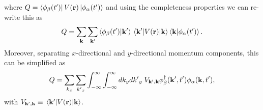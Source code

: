 where $Q = \bra{\phi_{\beta}(t')}
V(\vb{r}) \ket{\phi_{\alpha}(t')}$ and using the completeness properties we can re-write this as
\begin{equation} \label{eq_c18}
    Q =
    \sum_{\vb{k}}\sum_{\vb{k'}}
    \braket{\phi_{\beta}(t')}{\vb{k'}}
    \mel{\vb{k'}}{V(\vb{r})}{\vb{k}}
    \braket{\vb{k}}{\phi_{\alpha}(t')}.
\end{equation}
Moreover, separating $x$-directional and $y$-directional momentum components, this can be simplified as
\begin{equation} \label{eq_c19}
    Q =
    \sum_{k_x}\sum_{{k'}_x}
    \int_{-\infty}^{\infty} \int_{-\infty}^{\infty} dk_y d{k'}_y \;
    V_{\vb{k'},\vb{k}}
    \phi_{\beta}^{\dagger}(\vb{k'},t')
    \phi_{\alpha}(\vb{k},t'),
\end{equation}
with $V_{\vb{k'},\vb{k}} \equiv \mel{\vb{k'}}{V(\vb{r})}{\vb{k}}$.

